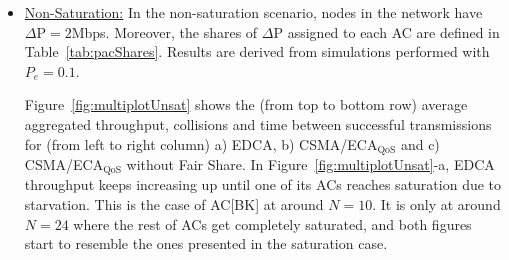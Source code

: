 \begin{itemize}
\item\underline{Non-Saturation:}
In the non-saturation scenario, nodes in the network have $\Delta\text{P}=2$Mbps. Moreover, the shares of $\Delta\text{P}$ assigned to each AC are defined in Table~\ref{tab:pacShares}. Results are derived from simulations performed with $P_e=0.1$.

Figure~\ref{fig:multiplotUnsat} shows the (from top to bottom row) average aggregated throughput, collisions and time between successful transmissions for (from left to right column) a) EDCA, b) CSMA/ECA$_{\text{QoS}}$ and c) CSMA/ECA$_{\text{QoS}}$ without Fair Share. In Figure~\ref{fig:multiplotUnsat}-a, EDCA throughput keeps increasing up until one of its ACs reaches saturation due to starvation. This is the case of AC[BK] at around $N=10$. It is only at around $N=24$ where the rest of ACs get completely saturated, and both figures start to resemble the ones presented in the saturation case.


\end{itemize}
